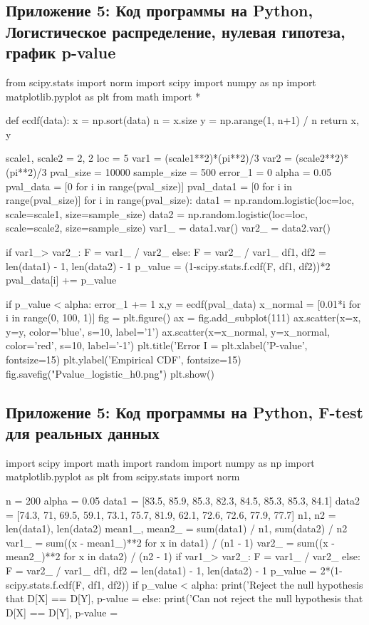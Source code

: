 \documentclass[12pt]{disser}
\begin{document}
\subsection*{Приложение 5: Код программы на Python, Логистическое распределение, нулевая гипотеза, график p-value}
\begin{python}
from scipy.stats import norm
import scipy
import numpy as np
import matplotlib.pyplot as plt
from math import *


def ecdf(data):
    x = np.sort(data)
    n = x.size
    y = np.arange(1, n+1) / n
    return x, y


scale1, scale2 = 2, 2
loc = 5
var1 = (scale1**2)*(pi**2)/3
var2 = (scale2**2)*(pi**2)/3
pval_size = 10000
sample_size = 500
error_1 = 0
alpha = 0.05
pval_data = [0 for i in range(pval_size)]
pval_data1 = [0 for i in range(pval_size)]
for i in range(pval_size):
    data1 = np.random.logistic(loc=loc, scale=scale1, size=sample_size)
    data2 = np.random.logistic(loc=loc, scale=scale2, size=sample_size)
    var1_ = data1.var()
    var2_ = data2.var()

    if var1_> var2_:
        F = var1_ / var2_
    else:
        F = var2_ / var1_
    df1, df2 = len(data1) - 1, len(data2) - 1
    p_value = (1-scipy.stats.f.cdf(F, df1, df2))*2
    pval_data[i] += p_value

    if p_value < alpha:
        error_1 += 1
x,y = ecdf(pval_data)
x_normal = [0.01*i for i in range(0, 100, 1)]
fig = plt.figure()
ax = fig.add_subplot(111)
ax.scatter(x=x, y=y, color='blue', s=10, label='1')
ax.scatter(x=x_normal, y=x_normal, color='red', s=10, label='-1')
plt.title('Error I = %
plt.xlabel('P-value', fontsize=15)
plt.ylabel('Empirical CDF', fontsize=15)
fig.savefig("Pvalue_logistic_h0.png")
plt.show()
\end{python}

\subsection*{Приложение 5: Код программы на Python, F-test для реальных данных}
\begin{python}
import scipy
import math
import random
import numpy as np
import matplotlib.pyplot as plt
from scipy.stats import norm


n = 200
alpha = 0.05
data1 = [83.5, 85.9, 85.3, 82.3, 84.5, 85.3, 85.3, 84.1]
data2 = [74.3, 71, 69.5, 59.1, 73.1, 75.7, 81.9, 62.1, 72.6, 72.6, 77.9, 77.7]
n1, n2 = len(data1), len(data2)
mean1_, mean2_ = sum(data1) / n1, sum(data2) / n2
var1_ = sum((x - mean1_)**2 for x in data1) / (n1 - 1)
var2_ = sum((x - mean2_)**2 for x in data2) / (n2 - 1)
if var1_> var2_:
    F = var1_ / var2_
else:
    F = var2_ / var1_
df1, df2 = len(data1) - 1, len(data2) - 1
p_value = 2*(1-scipy.stats.f.cdf(F, df1, df2))
if p_value < alpha:
    print('Reject the null hypothesis that D[X] == D[Y], p-value = %
else:
    print('Can not reject the null hypothesis that D[X] == D[Y], p-value = %
\end{python}
\end{document}
